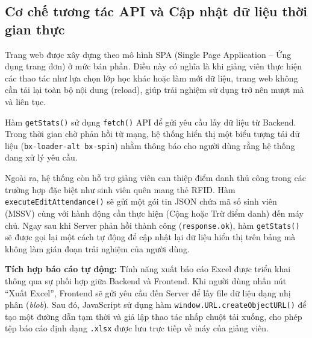 \documentclass[12pt,a4paper]{report}
\begin{document}
\subsection{Cơ chế tương tác API và Cập nhật dữ liệu thời gian thực}

Trang web được xây dựng theo mô hình SPA (Single Page Application – Ứng dụng trang đơn) ở mức bán phần. Điều này có nghĩa là khi giảng viên thực hiện các thao tác như lựa chọn lớp học khác hoặc làm mới dữ liệu, trang web không cần tải lại toàn bộ nội dung (reload), giúp trải nghiệm sử dụng trở nên mượt mà và liên tục.

Hàm \texttt{getStats()} sử dụng \texttt{fetch()} API để gửi yêu cầu lấy dữ liệu từ Backend. Trong thời gian chờ phản hồi từ mạng, hệ thống hiển thị một biểu tượng tải dữ liệu (\texttt{bx-loader-alt bx-spin}) nhằm thông báo cho người dùng rằng hệ thống đang xử lý yêu cầu.

Ngoài ra, hệ thống còn hỗ trợ giảng viên can thiệp điểm danh thủ công trong các trường hợp đặc biệt như sinh viên quên mang thẻ RFID. Hàm \texttt{executeEditAttendance()} sẽ gửi một gói tin JSON chứa mã số sinh viên (MSSV) cùng với hành động cần thực hiện (Cộng hoặc Trừ điểm danh) đến máy chủ. Ngay sau khi Server phản hồi thành công (\texttt{response.ok}), hàm \texttt{getStats()} sẽ được gọi lại một cách tự động để cập nhật lại dữ liệu hiển thị trên bảng mà không làm gián đoạn trải nghiệm của người dùng.

\textbf{Tích hợp báo cáo tự động:} Tính năng xuất báo cáo Excel được triển khai thông qua sự phối hợp giữa Backend và Frontend. Khi người dùng nhấn nút ``Xuất Excel'', Frontend sẽ gửi yêu cầu đến Server để lấy file dữ liệu dạng nhị phân (\textit{blob}). Sau đó, JavaScript sử dụng hàm \texttt{window.URL.createObjectURL()} để tạo một đường dẫn tạm thời và giả lập thao tác nhấp chuột tải xuống, cho phép tệp báo cáo định dạng \texttt{.xlsx} được lưu trực tiếp về máy của giảng viên.
\end{document}
